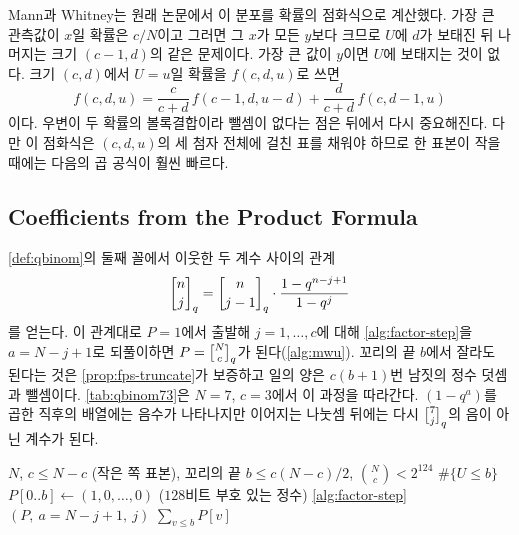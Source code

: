 Mann과 Whitney는 원래 논문에서 이 분포를 확률의 점화식으로 계산했다. 가장 큰 관측값이 $x$일 확률은 $c/N$이고 그러면 그 $x$가 모든 $y$보다 크므로 $U$에 $d$가 보태진 뒤 나머지는 크기 $(c-1,d)$의 같은 문제이다. 가장 큰 값이 $y$이면 $U$에 보태지는 것이 없다. 크기 $(c,d)$에서 $U=u$일 확률을 $f(c,d,u)$로 쓰면
\[
f(c,d,u)=\frac c{c+d}\,f(c-1,d,u-d)+\frac d{c+d}\,f(c,d-1,u)
\]
이다\cite{mannwhitney1947}. 우변이 두 확률의 볼록결합이라 뺄셈이 없다는 점은 뒤에서 다시 중요해진다. 다만 이 점화식은 $(c,d,u)$의 세 첨자 전체에 걸친 표를 채워야 하므로 한 표본이 작을 때에는 다음의 곱 공식이 훨씬 빠르다.

\subsection{Coefficients from the Product Formula}

\cref{def:qbinom}의 둘째 꼴에서 이웃한 두 계수 사이의 관계
\begin{equation}
\label{eq:qbinom-product}
\qbinom nj=\qbinom n{j-1}\cdot\frac{1-q^{n-j+1}}{1-q^j}
\end{equation}
를 얻는다. 이 관계대로 $P=1$에서 출발해 $j=1,\dots,c$에 대해 \cref{alg:factor-step}을 $a=N-j+1$로 되풀이하면 $P=\qbinom Nc$가 된다(\cref{alg:mwu}). 꼬리의 끝 $b$에서 잘라도 된다는 것은 \cref{prop:fps-truncate}가 보증하고 일의 양은 $c(b+1)$번 남짓의 정수 덧셈과 뺄셈이다. \cref{tab:qbinom73}은 $N=7$, $c=3$에서 이 과정을 따라간다. $(1-q^a)$를 곱한 직후의 배열에는 음수가 나타나지만 이어지는 나눗셈 뒤에는 다시 $\qbinom7j$의 음이 아닌 계수가 된다.

\begin{algorithm}[htbp]
\begin{algorithmic}[1]
\Require $N$, $c\le N-c$ (작은 쪽 표본), 꼬리의 끝 $b\le c(N-c)/2$, $\binom Nc<2^{124}$
\Ensure $\#\{U\le b\}$
\State $P[0..b]\gets(1,0,\dots,0)$ ($128$비트 부호 있는 정수)
 \cref{alg:factor-step}$(P,\ a=N-j+1,\ j)$ 
\EndFor
\State \Return $\sum_{v\le b}P[v]$ 
\end{algorithmic}
\caption{Mann--Whitney의 정확한 꼬리 (stardust 의 )}
\label{alg:mwu}
\end{algorithm}

